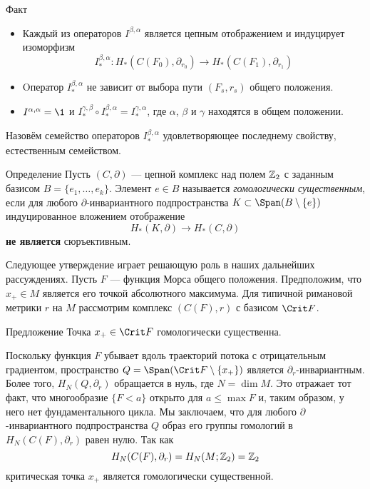 \begin{thm}{Факт}\label{13.2.E}
  \begin{itemize}
  \item
    Каждый из операторов $I^{\beta,\alpha}$ является цепным
    отображением и индуцирует изоморфизм
    \[
    I^{\beta,\alpha}_{*} :
    H_{*}(C(F_{0}),\partial_{r_{0}}) \to
    H_{*}(C(F_{1}),\partial_{r_{1}})
    \]
  \item
    Oператор $I^{\beta,\alpha}_{*}$ не зависит от выбора пути
    $(F_{s},r_{s})$ общего положения.
  \item
    $I^{\alpha,\alpha}=\1$ и $I^{\gamma,\beta}_{*}\circ
    I^{\beta,\alpha}_{*}=I^{\gamma,\alpha}_{*}$, где $\alpha$, $\beta$ и
    $\gamma$ находятся в общем положении.
  \end{itemize}
\end{thm}

Назовём семейство операторов $I^{\beta,\alpha}_{*}$ удовлетворяющее
последнему свойству, естественным семейством. 

\begin{ex}{Определение}\label{13.2.F}
Пусть $(C, \partial)$ — цепной комплекс над полем $\mathbb{Z}_{2}$ с заданным
базисом $B = \{e_{1},\dots,e_{k}\}$. 
Элемент $e\in B$ называется \emph{гомологически существенным}, если для 
любого $\partial$-инвариантного подпространства $K\subset
\Span(B\setminus \{e\})$ индуцированное вложением отображение 
\[
H_{*}(K,\partial)\to H_{*}(C,\partial)
\]
\textbf{не является} сюръективным.
\end{ex}

Следующее утверждение играет решающую роль в наших дальнейших рассуждениях.
Пусть $F$ — функция Морса общего положения.
Предположим, что $x_{+}\in M$ является его  точкой
абсолютного максимума. 
Для типичной римановой метрики $r$ на $M$ рассмотрим комплекс
$(C(F),r)$ с базисом $\Crit F$. 

\begin{thm}{Предложение}\label{13.2.G}
  Точка $x_{+}\in\Crit F$ гомологически существенна.  
\end{thm}
 Поскольку функция $F$
убывает вдоль траекторий потока с отрицательным градиентом,
пространство
$Q \z= \Span(\Crit F \setminus \{x_{+}\})$ является $\partial_{r}$-инвариантным.
Более того, $H_{N}(Q,\partial_{r})$ обращается в нуль, где $N = \dim M$.
Это отражает тот факт, что многообразие $\{F<a\}$ открыто для $a\le
\max F$ и, таким образом, у него нет фундаментального цикла. 
Мы заключаем, что для любого $\partial$-инвариантного подпространства
$Q$ образ его группы гомологий в $H_{N}(C(F),\partial_{r})$ равен
нулю. Так как
\[
H_{N}(C(F),\partial_{r})=H_{N}(M;\mathbb{Z}_{2})=\mathbb{Z}_{2}
\]
критическая точка $x_{+}$ является гомологически существенной.
\qeds

